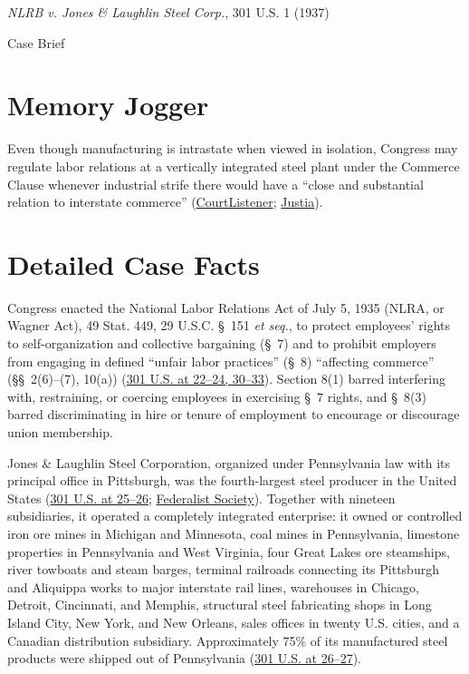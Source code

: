 \documentclass[12pt]{article}
\begin{document}
\begin{center}
{\LARGE \textit{NLRB v. Jones \& Laughlin Steel Corp.}, 301 U.S. 1 (1937)\par}
\vspace{0.8em}
{\large Case Brief\par}
\end{center}
\vspace{1em}

\section{Memory Jogger}

Even though manufacturing is intrastate when viewed in isolation, Congress may regulate labor relations at a vertically integrated steel plant under the Commerce Clause whenever industrial strife there would have a ``close and substantial relation to interstate commerce'' (\href{https://www.courtlistener.com/opinion/102804/national-labor-relations-board-v-jones-laughlin-steel-corp/}{CourtListener}; \href{https://supreme.justia.com/cases/federal/us/301/1/}{Justia}).

\section{Detailed Case Facts}

Congress enacted the National Labor Relations Act of July 5, 1935 (NLRA, or Wagner Act), 49 Stat. 449, 29 U.S.C. \S~151 \textit{et seq.}, to protect employees' rights to self-organization and collective bargaining (\S~7) and to prohibit employers from engaging in defined ``unfair labor practices'' (\S~8) ``affecting commerce'' (\S\S~2(6)--(7), 10(a)) (\href{https://supreme.justia.com/cases/federal/us/301/1/}{301 U.S. at 22--24, 30--33}). Section 8(1) barred interfering with, restraining, or coercing employees in exercising \S~7 rights, and \S~8(3) barred discriminating in hire or tenure of employment to encourage or discourage union membership.

Jones \& Laughlin Steel Corporation, organized under Pennsylvania law with its principal office in Pittsburgh, was the fourth-largest steel producer in the United States (\href{https://supreme.justia.com/cases/federal/us/301/1/}{301 U.S. at 25--26}; \href{https://fedsoc.org/case/nlrb-v-jones-laughlin-steel-corp}{Federalist Society}). Together with nineteen subsidiaries, it operated a completely integrated enterprise: it owned or controlled iron ore mines in Michigan and Minnesota, coal mines in Pennsylvania, limestone properties in Pennsylvania and West Virginia, four Great Lakes ore steamships, river towboats and steam barges, terminal railroads connecting its Pittsburgh and Aliquippa works to major interstate rail lines, warehouses in Chicago, Detroit, Cincinnati, and Memphis, structural steel fabricating shops in Long Island City, New York, and New Orleans, sales offices in twenty U.S. cities, and a Canadian distribution subsidiary. Approximately 75\% of its manufactured steel products were shipped out of Pennsylvania (\href{https://supreme.justia.com/cases/federal/us/301/1/}{301 U.S. at 26--27}).
\end{document}
